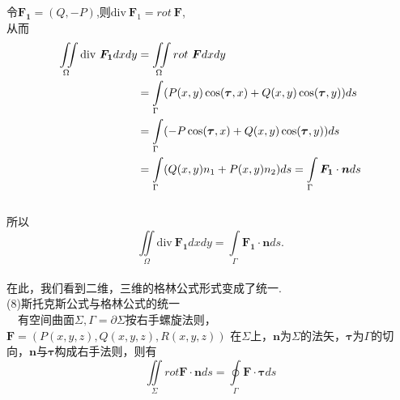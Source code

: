 \documentclass[UTF8]{ctexart}
\begin{document}
令$\bm{F_1}=(Q,-P)$,则$\mathrm{div}~\bm{F}_1=rot~\bm{F}$,\\
从而\\
\begin{equation*}
\begin{split}
\iint\limits_\Omega \mathrm{div}~\bm{F_1}dxdy&=\iint\limits_\Omega rot~\bm{F}dxdy\\
&=\int\limits_\Gamma(P(x,y)\cos(\bm{\tau},x)+Q(x,y)\cos(\bm{\tau},y))ds\\
&=\int\limits_\Gamma(-P\-\cos(\bm{\tau},x)+Q(x,y)\cos(\bm{\tau},y))ds\\
&=\int\limits_\Gamma(Q(x,y)n_1+P(x,y)n_2)ds=\int\limits_\Gamma\bm{F_1}\cdot\bm{n}ds 
\end{split}
\end{equation*}\\
所以\\
\begin{equation*}
\iint\limits_\Omega \mathrm{div}~\bm{F_1}dxdy=\int\limits_\Gamma \bm{F_1}\cdot\bm{n}ds.
\end{equation*}\\
在此，我们看到二维，三维的格林公式形式变成了统一.\\
(8)斯托克斯公式与格林公式的统一\\
~~有空间曲面$\Sigma,\Gamma=\partial\Sigma$按右手螺旋法则，$\bm{F}=(P(x,y,z),Q(x,y,z),R(x,y,z))$
在$\Sigma$上，$\bm{n}$为$\Sigma$的法矢，$\bm{\tau}$为$\Gamma$的切向，$\bm{n}$与$\bm{\tau}$构成右手法则，则有
\\\begin{equation*}
\iint\limits_\Sigma rot\bm{F}\cdot\bm{n} ds=\oint\limits_\Gamma \bm{F}\cdot\bm{\tau} ds 
\end{equation*}\\
\end{document}
